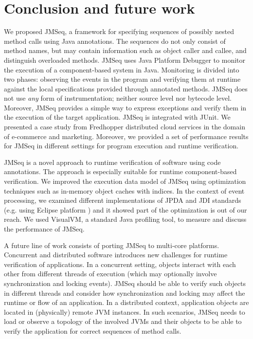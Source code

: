 \section{Conclusion and future work} \label{sec:conclusion}

We proposed JMSeq, a framework for specifying sequences of possibly nested method calls using Java annotations. 
The sequences do not only consist of method names, but may contain information such as object caller and callee, and distinguish overloaded methods. 
JMSeq uses Java Platform Debugger to monitor the execution of a component-based system in Java. 
Monitoring is divided into two phases: observing the events in the program and verifying them at runtime against the local specifications provided through annotated methods. 
JMSeq does not use \emph{any} form of instrumentation; neither source level nor bytecode level.
Moreover, JMSeq provides a simple way to express exceptions and verify them in the execution of the target application. JMSeq is integrated with JUnit.
We presented a case study from Fredhopper distributed cloud services in the domain of e-commerce and marketing. 
Moreover, we provided a set of performance results for JMSeq in different settings for program execution and runtime verification.

JMSeq is a novel approach to runtime verification of software using code annotations. 
The approach is especially suitable for runtime component-based verification. 
We improved the execution data model of JMSeq using optimization techniques such as in-memory object caches with indices.
In the context of event processing, we examined different implementations of JPDA and JDI standards (e.g. using Eclipse platform \cite{eclipse_debug_platform}) and it showed part of the optimization is out of our reach. 
We used VisualVM, a standard Java profiling tool, to measure and discuss the performance of JMSeq.

A future line of work consists of porting JMSeq to multi-core platforms. 
Concurrent and distributed software introduces new challenges for runtime verification of applications. 
In a concurrent setting, objects interact with each other from different threads of execution (which may optionally involve synchronization and locking events).
JMSeq should be able to verify such objects in different threads and consider how synchronization and locking may affect the runtime or flow of an application.
In a distributed context, application objects are located in (physically) remote JVM instances.
In such scenarios, JMSeq needs to load or observe a topology of the involved JVMs and their objects to be able to verify the application for correct sequences of method calls.

